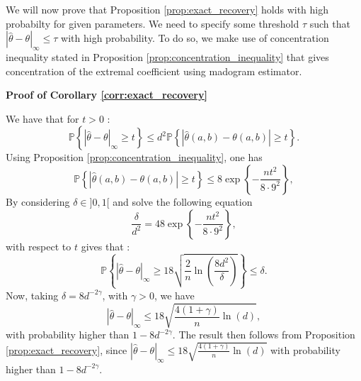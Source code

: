 \documentclass[11pt]{article}
\makeatletter
\renewenvironment{proof}[1][\proofname]{\par
\pushQED{\qed}%
\normalfont \topsep6\p@\@plus6\p@\relax
\trivlist
\item\relax
{\textbf{
#1\@addpunct{ }}}\hspace\labelsep\ignorespaces
}{%
\popQED\endtrivlist\@endpefalse
}
\makeatother
\begin{document}
	We will now prove that Proposition \ref{prop:exact_recovery} holds with high probabilty for given parameters. We need to specify some threshold $\tau$ such that $|\hat{\theta} - \theta|_{\infty} \leq \tau$ with high probability. To do so, we make use of concentration inequality stated in Proposition \ref{prop:concentration_inequality} that gives concentration of the extremal coefficient using madogram estimator.
	
	\begin{proof}[Proof of Corollary \ref{corr:exact_recovery}]
		We have that for $t>0$ :
		\begin{equation*}
			\mathbb{P}\left\{ |\hat{\theta} - \theta|_{\infty} \geq t \right\} \leq d^2 \mathbb{P}\left\{|\hat{\theta}(a,b) - \theta(a,b)| \geq t \right\}.
		\end{equation*}
		Using Proposition \ref{prop:concentration_inequality}, one has 
		\begin{equation*}
			\mathbb{P}\left\{|\hat{\theta}(a,b) - \theta(a,b)| \geq t \right\} \leq 8 \exp\left\{ - \frac{nt^2}{8 \cdot 9^2} \right\},
		\end{equation*}
		By considering $\delta \in ]0,1[$ and solve the following equation
		\begin{equation*}
			\frac{\delta}{d^2} = 4 8 \exp\left\{ - \frac{nt^2}{8 \cdot 9^2}\right\},
		\end{equation*}
		with respect to $t$ gives that :
		\begin{equation*}
			\mathbb{P}\left\{ |\hat{\theta} - \theta|_{\infty} \geq 18 \sqrt{\frac{2}{n} \ln\left( \frac{8 d^2}{\delta} \right)} \right\} \leq \delta.
		\end{equation*}
		Now, taking $\delta = 8d^{-2\gamma}$, with $\gamma > 0$, we have
		\begin{equation*}
			|\hat{\theta} - \theta|_{\infty} \leq 18 \sqrt{\frac{4(1+\gamma)}{n} \ln\left( d \right)},
		\end{equation*}
		with probability higher than $1 - 
		8d^{-2\gamma}$. The result then follows from Proposition \ref{prop:exact_recovery}, since $|\hat{\theta} - \theta|_{\infty} \leq 18 \sqrt{\frac{4(1+\gamma)}{n} \ln(d)}$ with probability higher than $1-8d^{-2\gamma}$.
	\end{proof}
	
\end{document}
